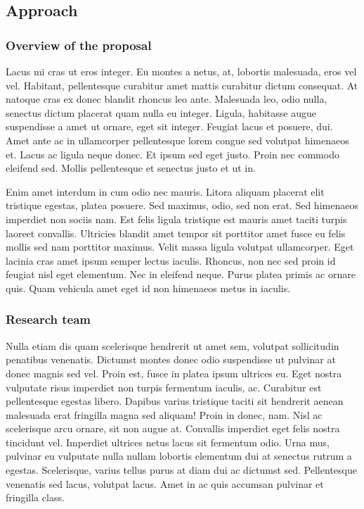 \documentclass[11pt,]{article}
\begin{document}
\hypertarget{approach}{%
\subsection{Approach}\label{approach}}

\hypertarget{overview-of-the-proposal}{%
\subsubsection{Overview of the
proposal}\label{overview-of-the-proposal}}

Lacus mi cras ut eros integer. Eu montes a netus, at, lobortis
malesuada, eros vel vel. Habitant, pellentesque curabitur amet mattis
curabitur dictum consequat. At natoque cras ex donec blandit rhoncus leo
ante. Malesuada leo, odio nulla, senectus dictum placerat quam nulla eu
integer. Ligula, habitasse augue suspendisse a amet ut ornare, eget sit
integer. Feugiat lacus et posuere, dui. Amet ante ac in ullamcorper
pellentesque lorem congue sed volutpat himenaeos et. Lacus ac ligula
neque donec. Et ipsum sed eget justo. Proin nec commodo eleifend sed.
Mollis pellentesque et senectus justo et ut in.

Enim amet interdum in cum odio nec mauris. Litora aliquam placerat elit
tristique egestas, platea posuere. Sed maximus, odio, sed non erat. Sed
himenaeos imperdiet non sociis nam. Est felis ligula tristique est
mauris amet taciti turpis laoreet convallis. Ultricies blandit amet
tempor sit porttitor amet fusce eu felis mollis sed nam porttitor
maximus. Velit massa ligula volutpat ullamcorper. Eget lacinia cras amet
ipsum semper lectus iaculis. Rhoncus, non nec sed proin id feugiat nisl
eget elementum. Nec in eleifend neque. Purus platea primis ac ornare
quis. Quam vehicula amet eget id non himenaeos metus in iaculis.

\hypertarget{research-team}{%
\subsubsection{Research team}\label{research-team}}

Nulla etiam dis quam scelerisque hendrerit ut amet sem, volutpat
sollicitudin penatibus venenatis. Dictumst montes donec odio suspendisse
ut pulvinar at donec magnis sed vel. Proin est, fusce in platea ipsum
ultrices eu. Eget nostra vulputate risus imperdiet non turpis fermentum
iaculis, ac. Curabitur est pellentesque egestas libero. Dapibus varius
tristique taciti sit hendrerit aenean malesuada erat fringilla magna sed
aliquam! Proin in donec, nam. Nisl ac scelerisque arcu ornare, sit non
augue at. Convallis imperdiet eget felis nostra tincidunt vel. Imperdiet
ultrices netus lacus sit fermentum odio. Urna mus, pulvinar eu vulputate
nulla nullam lobortis elementum dui at senectus rutrum a egestas.
Scelerisque, varius tellus purus at diam dui ac dictumst sed.
Pellentesque venenatis sed lacus, volutpat lacus. Amet in ac quis
accumsan pulvinar et fringilla class.
\end{document}
